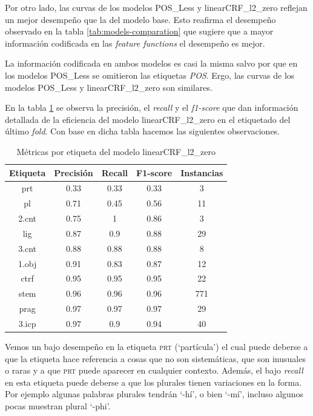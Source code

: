 \documentclass[letterpaper,12pt,oneside]{book}
\theoremstyle{definition}
\begin{document}
Por otro lado, las curvas de los modelos \textsf{POS\_Less} y \textsf{linearCRF\_l2\_zero} reflejan un mejor desempeño que la del modelo base. Esto reafirma el desempeño observado en la tabla \ref{tab:models-comparation} que sugiere que a mayor información codificada en las \textit{feature functions} el desempeño es mejor.

La información codificada en ambos modelos es casi la misma salvo por que en los modelos \textsf{POS\_Less} se omitieron las etiquetas \textit{POS}. Ergo, las curvas de los modelos \textsf{POS\_Less} y \textsf{linearCRF\_l2\_zero} son  similares.

En la tabla \ref{tab:tags-linearcrf} se observa la precisión, el \textit{recall} y el \textit{f1-score} que dan información detallada de la eficiencia del modelo \textsf{linearCRF\_l2\_zero} en el etiquetado del último \textit{fold}. Con base en dicha tabla hacemos las siguientes observaciones.

\begin{table}[ht]
    \centering
    \begin{tabular}{| c | c | c | c | c |}\hline
        \textbf{Etiqueta} & \textbf{Precisión} & \textbf{Recall} & \textbf{F1-score} & \textbf{Instancias} \\\hline
        prt & 0.33 & 0.33 & 0.33 & 3\\
        pl & 0.71 & 0.45 & 0.56 & 11\\
        2.cnt & 0.75 & 1 & 0.86 & 3\\
        lig & 0.87 & 0.9 & 0.88 & 29\\
        3.cnt & 0.88 & 0.88 & 0.88 & 8\\
        1.obj & 0.91 & 0.83 & 0.87 & 12\\
        ctrf & 0.95 & 0.95 & 0.95 & 22\\
        stem & 0.96 & 0.96 & 0.96 & 771\\
        prag & 0.97 & 0.97 & 0.97 & 29\\
        3.icp & 0.97 & 0.9 & 0.94 & 40\\\hline
    \end{tabular}
    \caption{Métricas por etiqueta del modelo \textsf{linearCRF\_l2\_zero}}
    \label{tab:tags-linearcrf}
\end{table}

Vemos un bajo desempeño en la etiqueta \textsc{prt} (`partícula') el cual puede deberse a que la etiqueta hace referencia a cosas que no son sistemáticas, que son inusuales o raras y a que \textsc{prt} puede aparecer en cualquier contexto. Además, el bajo \textit{recall} en esta etiqueta puede deberse a que los plurales tienen variaciones en la forma. Por ejemplo algunas palabras plurales tendrán `-hí', o bien `-mí', incluso algunos pocas muestran plural `-phi'.
\end{document}
